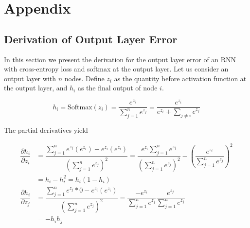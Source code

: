 \documentclass[pageno]{jpaper}
\begin{document}
\newpage
{}


\newpage

\section{Appendix}
\label{Appendix}

\subsection{Derivation of Output Layer Error}
\label{Derivation of Output Layer Error}

In this section we present the derivation for the output layer error of an RNN
with cross-entropy loss and softmax at the output layer. Let us consider an
output layer with $n$ nodes. Define $z_i$ as the quantity before activation
function at the output layer, and $h_i$ as the final output of node $i$.

\begin{equation}
    \label{eq: output layer value}
    h_i = \text{Softmax}(z_i) = \dfrac{e^{z_i}}{\sum\limits_{j=1}^n e^{z_j}} = \dfrac{e^{z_i}}
    {e^{z_i} + \sum\limits_{j\neq i} e^{z_j}}
\end{equation}

The partial derivatives yield

\begin{equation}
    \label{eq: output partials}
    \begin{aligned}
        \dfrac{\partial h_i}{\partial z_i} &= \dfrac{\sum\limits_{j=1}^n e^{z_j}(e^{z_i}) - e^{z_i}(e^{z_i})}
        {\left( \sum\limits_{j=1}^n e^{z_j} \right)^2}
        = \dfrac{e^{z_i}\sum\limits_{j=1}^n e^{z_j}}{\left( \sum\limits_{j=1}^n e^{z_j} \right)^2}
        - \left( \dfrac{e^{z_i}}{ \sum\limits_{j=1}^n e^{z_j} } \right)^2 \\
        &= h_i - h_i^2
        = h_i\left( 1 - h_i \right) \\
        \dfrac{\partial h_i}{\partial z_j} &= \dfrac{\sum\limits_{j=1}^n e^{z_j}*0 - e^{z_i}(e^{z_i})}
        {\left( \sum\limits_{j=1}^n e^{z_j} \right)^2}
        = \dfrac{-e^{z_i}}{\sum\limits_{j=1}^n e^{z_j}}\dfrac{e^{z_j}}{\sum\limits_{j=1}^n e^{z_j}} \\
        &= -h_ih_j
    \end{aligned}
\end{equation}
\end{document}
